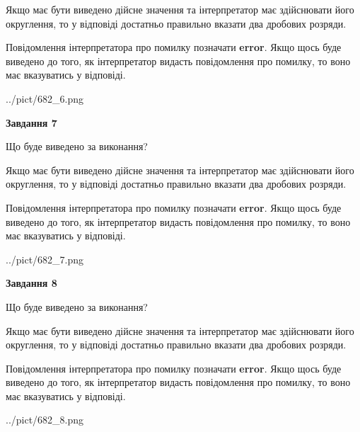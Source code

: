\documentclass[12pt, ukrainian]{article}
\begin{document}
{\begin {Large}
Якщо має бути виведено дійсне значення та інтерпретатор має здійснювати його округлення, 
то у відповіді достатньо правильно вказати два дробових розряди.

Повідомлення інтерпретатора про помилку позначати \textbf{error}.
Якщо щось буде виведено до того, як інтерпретатор видасть повідомлення про помилку, 
то воно має вказуватись у відповіді. \par

\begin{center}
	{../pict/682_6.png}
\end{center}
\newpage

{\begin {center}\textbf{Завдання 7}\end {center}}\par
Що буде виведено за виконання? \par

Якщо має бути виведено дійсне значення та інтерпретатор має здійснювати його округлення, 
то у відповіді достатньо правильно вказати два дробових розряди.

Повідомлення інтерпретатора про помилку позначати \textbf{error}.
Якщо щось буде виведено до того, як інтерпретатор видасть повідомлення про помилку, 
то воно має вказуватись у відповіді. \par

\begin{center}
	{../pict/682_7.png}
\end{center}
\newpage

{\begin {center}\textbf{Завдання 8}\end {center}}\par
Що буде виведено за виконання? \par

Якщо має бути виведено дійсне значення та інтерпретатор має здійснювати його округлення, 
то у відповіді достатньо правильно вказати два дробових розряди.

Повідомлення інтерпретатора про помилку позначати \textbf{error}.
Якщо щось буде виведено до того, як інтерпретатор видасть повідомлення про помилку, 
то воно має вказуватись у відповіді. \par

\begin{center}
	{../pict/682_8.png}
\end{center}
\newpage


\end{Large}}
\end{document}
